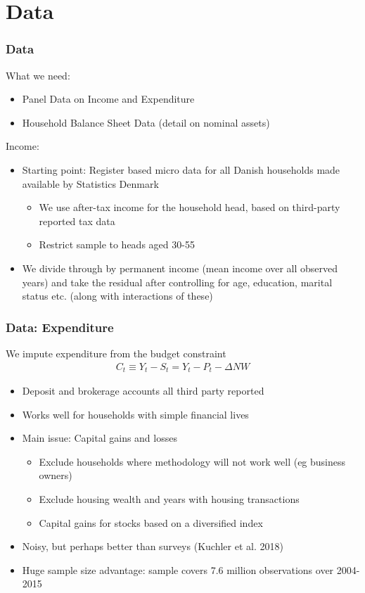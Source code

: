 \documentclass{beamer}
\begin{document}
\section{Data}
\frame
{
	\frametitle{Data}
	What we need:
	\begin{itemize}
		\item Panel Data on Income and Expenditure
		\item Household Balance Sheet Data (detail on nominal assets)
	\end{itemize}
	\pause
	Income:
	\begin{itemize}
		\item Starting point: Register based micro data for all Danish households made available by Statistics Denmark
		\begin{itemize}
			\item We use after-tax income for the household head, based on third-party reported tax data
			\item Restrict sample to heads aged 30-55
		\end{itemize}
		\item We divide through by permanent income (mean income over all observed years) and take the residual after controlling for age, education, marital status etc. (along with interactions of these)
	\end{itemize}
}
\frame
{
	\frametitle{Data: Expenditure}
	We impute expenditure from the budget constraint
		\begin{align*}
			C_t \equiv Y_t - S_t = Y_t - P_t - \Delta NW
		\end{align*}
	\begin{itemize}
		\item Deposit and brokerage accounts all third party reported
		\item Works well for households with simple financial lives
		\item Main issue: Capital gains and losses
		\begin{itemize}
			\item Exclude households where methodology will not work well (eg business owners)
			\item Exclude housing wealth and years with housing transactions
			\item Capital gains for stocks based on a diversified index
		\end{itemize}
		\item Noisy, but perhaps better than surveys (Kuchler et al. 2018)
		\item Huge sample size advantage: sample covers 7.6 million observations over 2004-2015
	\end{itemize}
}
\end{document}
